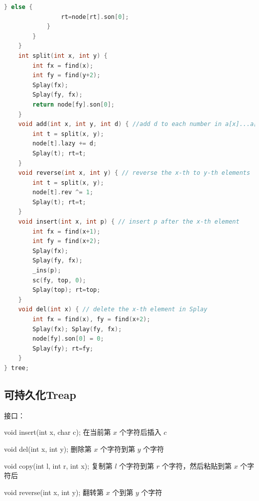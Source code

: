\documentclass{article}
\begin{document}
\begin{lstlisting}[language=C++]
			} else {
				rt=node[rt].son[0];
			}
		}
	}
	int split(int x, int y) {
		int fx = find(x);
		int fy = find(y+2);
		Splay(fx);
		Splay(fy, fx);
		return node[fy].son[0];
	}
	void add(int x, int y, int d) { //add d to each number in a[x]...a[y]
		int t = split(x, y);
		node[t].lazy += d;
		Splay(t); rt=t;
	}
	void reverse(int x, int y) { // reverse the x-th to y-th elements
		int t = split(x, y);
		node[t].rev ^= 1;
		Splay(t); rt=t;
	}
	void insert(int x, int p) { // insert p after the x-th element
		int fx = find(x+1);
		int fy = find(x+2);
		Splay(fx);
		Splay(fy, fx);
		_ins(p);
		sc(fy, top, 0);
		Splay(top); rt=top;
	}
	void del(int x) { // delete the x-th element in Splay
		int fx = find(x), fy = find(x+2);
		Splay(fx); Splay(fy, fx);
		node[fy].son[0] = 0;
		Splay(fy); rt=fy;
	}
} tree;
\end{lstlisting}

\subsection{可持久化Treap}
接口： 

void insert(int x, char c); 在当前第 $x$ 个字符后插入 $c$ 

void del(int x, int y); 删除第 $x$ 个字符到第 $y$ 个字符 

void copy(int l, int r, int x); 复制第 $l$ 个字符到第 $r$ 个字符，然后粘贴到第 $x$ 个字符后 

void reverse(int x, int y); 翻转第 $x$ 个到第 $y$ 个字符 
\end{document}

